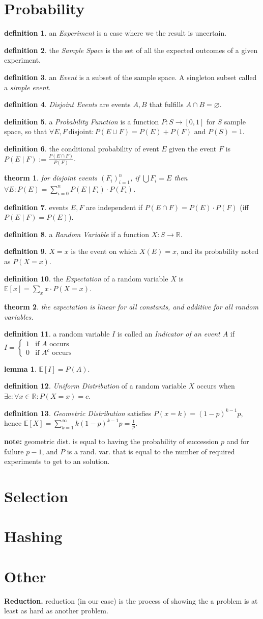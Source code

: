 \documentclass[]{article}
\newcommand\R     {\mathbb{R}}
\newcommand\E     {\mathbb{E}}
\renewcommand\inf {\infty}
\newcommand\sumni     {\sum_{i = 0}^{n}}
\newcommand\co        {\colon}
\newtheorem{Theorem}{theorm}
\theoremstyle{definition}
\newtheorem{Definition}{definition}
\newtheorem{Lemma}{lemma}
\newcommand\theo  [1] {\begin{Theorem}#1\end{Theorem}}
\newcommand\defi  [1] {\begin{Definition}#1\end{Definition}}
\newcommand\lem   [1] {\begin{Lemma}#1\end{Lemma}}
\begin{document}
\begin{multicols}{4}
		\section{Probability}
		\defi{an \textit{Experiment} is a case where we the result is uncertain. }
		\defi{the \textit{Sample Space} is the set of all the expected outcomes of a given experiment. }
		\defi{an \textit{Event} is a subset of the sample space. A singleton subset called a \textit{simple event}. }
		\defi{\textit{Disjoint Events} are events $A, B$ that fulfills $A \cap B = \varnothing$. }
		\defi{a \textit{Probability Function} is a function $P \co S \to [0, 1]$ for $S$ sample space, so that $\forall E, F \ \text{disjoint} \co P(E \cup F) = P(E) + P(F)$ and $P(S) = 1$. }
		\defi{the conditional probability of event $E$ given the event $F$ is $P(E \mid F) := \frac{P(E \cap F)}{P(F)}$. }
		\theo{for disjoint events $(F_i)_{i = 1}^{n}$, if $\bigcup F_i = E $ then $\forall E \co P(E) = \sumni P(E \mid F_i) \cdot P(F_i)$. }
		\defi{events $E, F$ are independent if $P(E \cap F) = P(E) \cdot P(F)$ (iff $P(E \mid F) = P(E)$). }
		\defi{a \textit{Random Variable} if a function $X \co S \to \R$. }
		\defi{$X = x$ is the event on which $X(E) = x$, and its probability noted as $P(X = x)$. }
		\defi{the \textit{Expectation} of a random variable $X$ is $\E[x] = \sum_{x} x \cdot P(X = x)$. }
		\theo{the expectation is linear for all constants, and additive for all random variables. }
		\defi{a random variable $I$ is called an \textit{Indicator of an event $A$} if $I = \begin{cases}
				1 & \text{if $A$ occurs} \\
				0 & \text{if $A^c$ occurs}
			\end{cases}$}
		\lem{$\E[I] = P(A)$. }
		\defi{\textit{Uniform Distribution} of a random variable $X$ occurs when $\exists c \co \forall x \in \R \co P(X = x) = c$. }
		\defi{\textit{Geometric Distribution} satisfies $P(x = k) = (1 - p)^{k - 1}p$, hence $\E[X] = \sum_{k = 1}^{\inf} k(1 - p)^{k - 1}p = \frac{1}{p}$. }
		\textbf{note: }geometric dist. is equal to having the probability of succession $p$ and for failure $p - 1$, and $P$ is a rand. var. that is equal to the number of required experiments to get to an solution. 
		
		\section{Selection}
		
		\section{Hashing}
		
		\section{Other}
		\textbf{Reduction. }reduction (in our case) is the process of showing the a problem is at least as hard as another problem. 
		
		
	\end{multicols}
	
\end{document}
